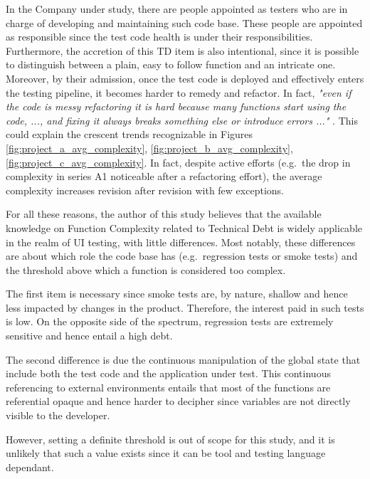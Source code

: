     In the Company under study, there are people appointed as testers who are in charge of developing and maintaining such code base. These people are appointed as responsible since the test code health is under their responsibilities. Furthermore, the accretion of this TD item is also intentional, since it is possible to distinguish between a plain, easy to follow function and an intricate one. Moreover, by their admission, once the test code is deployed and effectively enters the testing pipeline, it becomes harder to remedy and refactor. In fact, \textit{"even if the code is messy refactoring it is hard because many functions start using the code, ..., and fixing it always breaks something else or introduce errors ..." }. This could explain the crescent trends recognizable in Figures \ref{fig:project_a_avg_complexity}, \ref{fig:project_b_avg_complexity}, \ref{fig:project_c_avg_complexity}. In fact, despite active efforts (e.g.\ the drop in complexity in series A1 noticeable after a refactoring effort), the average complexity increases revision after revision with few exceptions.
    
    
    For all these reasons, the author of this study believes that the available knowledge on Function Complexity related to Technical Debt is widely applicable in the realm of UI testing, with little differences. Most notably, these differences are about which role the code base has (e.g.\ regression tests or smoke tests) and the threshold above which a function is considered too complex. 


     \label{sec:disc-rq3-function-complexity}    
    The first item is necessary since smoke tests are, by nature, shallow and hence less impacted by changes in the product. Therefore, the interest paid in such tests is low. On the opposite side of the spectrum, regression tests are extremely sensitive and hence entail a high debt.
    
    The second difference is due the continuous manipulation of the global state that include both the test code and the application under test. This continuous referencing to external environments entails that most of the functions are referential opaque \cite{referential_transparency} and hence harder to decipher since variables are not directly visible to the developer.
    
    However, setting a definite threshold is out of scope for this study, and it is unlikely that such a value exists since it can be tool and testing language dependant.
    
